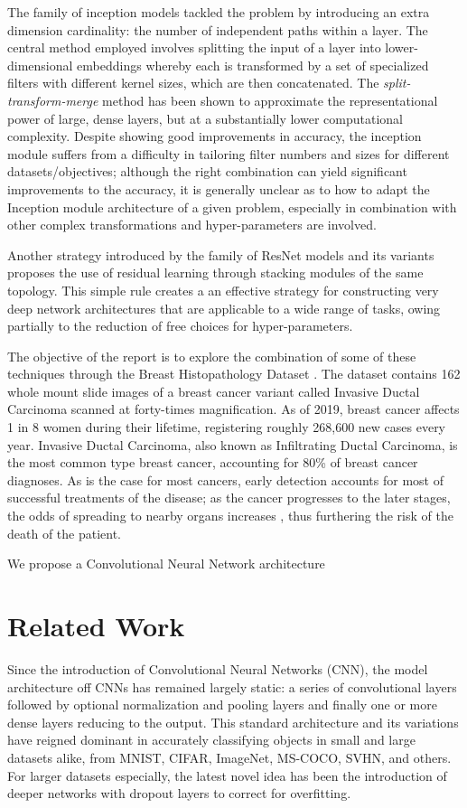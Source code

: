 \documentclass[conference]{IEEEtran}
\begin{document}
The family of inception models \cite{Szegedy2014, Szegedy2015, Szegedy2016} tackled the problem by introducing an extra dimension cardinality: the number of independent paths within a layer. The central method employed involves splitting the input of a layer into lower-dimensional embeddings whereby each is transformed by a set of specialized filters with different kernel sizes, which are then concatenated. The \emph{split-transform-merge} method has been shown to approximate the representational power of large, dense layers, but at a substantially lower computational complexity. Despite showing good improvements in accuracy, the inception module suffers from a difficulty in tailoring filter numbers and sizes for different datasets/objectives; although the right combination can yield significant improvements to the accuracy, it is generally unclear as to how to adapt the Inception module architecture of a given problem, especially in combination with other complex transformations and hyper-parameters are involved.

Another strategy introduced by the family of ResNet models and its variants proposes the use of residual learning through stacking modules of the same topology. This simple rule creates a an effective strategy for constructing very deep network architectures that are applicable to a wide range of tasks, owing partially to the reduction of free choices for hyper-parameters.

The objective of the report is to explore the combination of some of these techniques \cite{Szegedy2014, He2016} through the Breast Histopathology Dataset \cite{Mooney2017}. The dataset contains 162 whole mount slide images of a breast cancer variant called Invasive Ductal Carcinoma scanned at forty-times magnification. As of 2019, breast cancer affects 1 in 8 \cite{DeSantis2019} women during their lifetime, registering roughly 268,600 new cases every year. Invasive Ductal Carcinoma, also known as Infiltrating Ductal Carcinoma, is the most common type breast cancer, accounting for 80\% \cite{Sharma2010} of breast cancer diagnoses. As is the case for most cancers, early detection accounts for most of successful treatments of the disease; as the cancer progresses to the later stages, the odds of spreading to nearby organs increases \cite{Milosevic2018}, thus furthering the risk of the death of the patient.

We propose a Convolutional Neural Network architecture 

\section{Related Work}
Since the introduction of Convolutional Neural Networks (CNN), the model architecture off CNNs has remained largely static: a series of convolutional layers followed by optional normalization and pooling layers and finally one or more dense layers reducing to the output. This standard architecture and its variations have reigned dominant in accurately classifying objects in small and large datasets alike, from MNIST, CIFAR, ImageNet, MS-COCO, SVHN, and others. For larger datasets especially, the latest novel idea has been the introduction of deeper networks with dropout layers to correct for overfitting.
\end{document}
